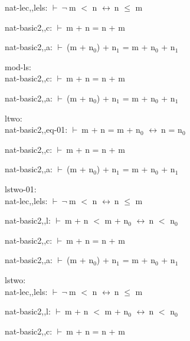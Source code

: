 \documentclass[a4paper]{article}
\newcommand{\Fol}{\mbox{$\vdash\ $}}
\newcommand{\Not}{\mbox{$\neg\ $}}
\newcommand{\Equiv}{\mbox{$\leftrightarrow\ $}}
\begin{document}
nat-lec,,lels: 
 \Fol \Not m $<$ n \Equiv n $\le$ m



nat-basic2,,c: 
 \Fol m + n = n + m



nat-basic2,,a: 
 \Fol (m + $\mbox{n}_{0}$) + $\mbox{n}_{1}$ = m + $\mbox{n}_{0}$ + $\mbox{n}_{1}$



\bigskip

mod-ls:\\ nat-basic2,,c: 
 \Fol m + n = n + m



nat-basic2,,a: 
 \Fol (m + $\mbox{n}_{0}$) + $\mbox{n}_{1}$ = m + $\mbox{n}_{0}$ + $\mbox{n}_{1}$



\bigskip

ltwo:\\ nat-basic2,,eq-01: 
 \Fol m + n = m + $\mbox{n}_{0}$ \Equiv n = $\mbox{n}_{0}$



nat-basic2,,c: 
 \Fol m + n = n + m



nat-basic2,,a: 
 \Fol (m + $\mbox{n}_{0}$) + $\mbox{n}_{1}$ = m + $\mbox{n}_{0}$ + $\mbox{n}_{1}$



\bigskip

lstwo-01:\\ nat-lec,,lels: 
 \Fol \Not m $<$ n \Equiv n $\le$ m



nat-basic2,,l: 
 \Fol m + n $<$ m + $\mbox{n}_{0}$ \Equiv n $<$ $\mbox{n}_{0}$



nat-basic2,,c: 
 \Fol m + n = n + m



nat-basic2,,a: 
 \Fol (m + $\mbox{n}_{0}$) + $\mbox{n}_{1}$ = m + $\mbox{n}_{0}$ + $\mbox{n}_{1}$



\bigskip

lstwo:\\ nat-lec,,lels: 
 \Fol \Not m $<$ n \Equiv n $\le$ m



nat-basic2,,l: 
 \Fol m + n $<$ m + $\mbox{n}_{0}$ \Equiv n $<$ $\mbox{n}_{0}$



nat-basic2,,c: 
 \Fol m + n = n + m
\end{document}
